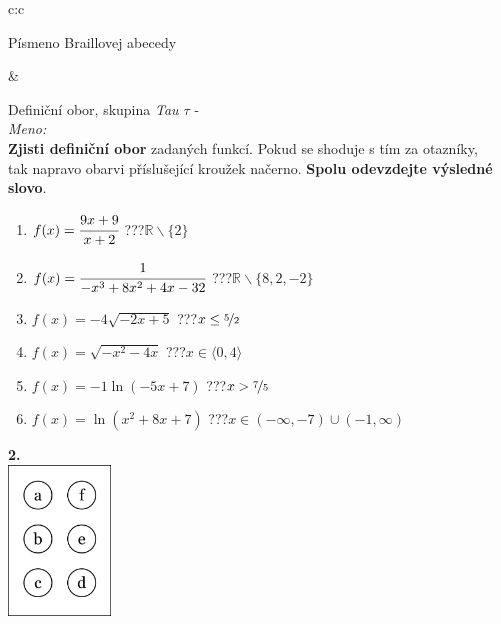 \documentclass[10pt]{report}
\begin{document}
\begin{tabular}{c:c}
\begin{minipage}[c][99mm][t]{0.49\linewidth}
\begin{center}
\begin{minipage}{0.20\linewidth}
\begin{center}
{\small Písmeno Braillovej abecedy}
\end{center}
\end{minipage}
\end{center}
\end{minipage}
&
\begin{minipage}[c][99mm][t]{0.49\linewidth}
\begin{center}
\vspace{7mm}
{\huge Definiční obor, skupina \textit{Tau $\tau$} -}\\[4.5mm]
\textit{Meno:}\phantom{xxxxxxxxxxxxxxxxxxxxxxxxxxxxxxxxxxxxxxxxxxxxxxxxxxxxxxxxxxxxxxxxx}\\[3.5mm]
\textbf{Zjisti definiční obor} zadaných funkcí. Pokud se shoduje s tím za otazníky,\\tak napravo obarvi příslušející kroužek načerno. \textbf{Spolu odevzdejte výsledné slovo}.\\[3mm]
\begin{minipage}{0.77\linewidth}
\begin{center}
\begin{varwidth}{\textwidth}
\begin{enumerate}
\normalsize
\item $f(x)=\cfrac{9x+9}{x+2}$\quad \dotfill\; ???\;\dotfill \quad $\mathbb{R}\smallsetminus\{2\}$
\item $f(x)=\cfrac{1}{-x^3+8x^2+4x-32}$\quad \dotfill\; ???\;\dotfill \quad $\mathbb{R}\smallsetminus\{8,2,-2\}$
\item $f(x)=-4\sqrt{-2x+5}$\quad \dotfill\; ???\;\dotfill \quad $x\leq\nicefrac{5}{2}$
\item $f(x)=\sqrt{-x^2-4x}$\quad \dotfill\; ???\;\dotfill \quad $x\in\langle0 , 4\rangle$
\item $f(x)=-1\ln{(-5x+7)}$\quad \dotfill\; ???\;\dotfill \quad $x>\nicefrac{7}{5}$
\item $f(x)=\ln{(x^2+8x+7)}$\quad \dotfill\; ???\;\dotfill \quad $x\in(-\infty , -7)\cup(-1 , \infty)$
\end{enumerate}
\end{varwidth}
\end{center}
\end{minipage}
\begin{minipage}{0.20\linewidth}
\begin{center}
{\Huge\bfseries 2.} \\[2mm]
\includegraphics[height=40mm]{../images/braille.png}

\end{center}
\end{minipage}
\end{center}
\end{minipage}
\end{tabular}
\end{document}
